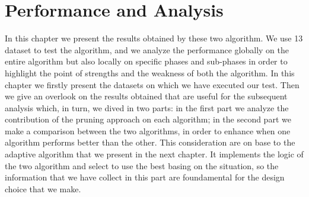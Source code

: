 \section{Performance and Analysis}\label{C6}
In this chapter we present the results obtained by these two algorithm. We use 13 dataset to test the algorithm, and we analyze the performance globally on the entire algorithm but also locally on specific phases and sub-phases in order to highlight the point of strengths and the weakness of both the algorithm. In this chapter we firstly present the datasets on which we have executed our test. Then we give an overlook on the results obtained that are useful for the subsequent analysis which, in turn, we dived in two parts: in the first part we analyze the contribution of the pruning approach on each algorithm; in the second part we make a comparison between the two algorithms, in order to enhance when one algorithm performs better than the other. This consideration are on base to the adaptive algorithm that we present in the next chapter. It implements the logic of the two algorithm and select to use the best basing on the situation, so the information that we have collect in this part are foundamental for the design choice that we make. 

